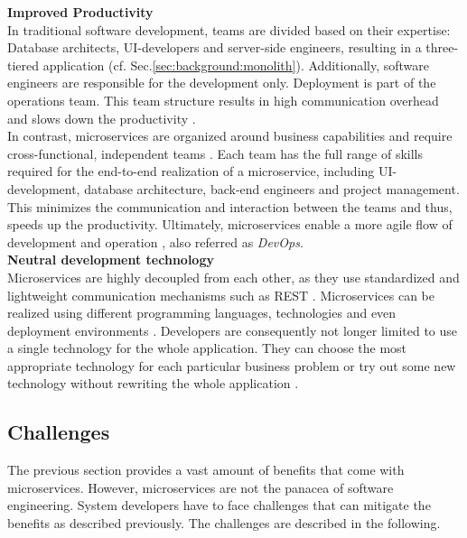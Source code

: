 \noindent
\textbf{Improved Productivity} \\
In traditional software development, teams are divided based on their expertise: Database architects, UI-developers and server-side engineers, resulting in a three-tiered application (cf. Sec.\ref{sec:background:monolith}). Additionally, software engineers are responsible for the development only. Deployment is part of the operations team. This team structure results in high communication overhead and slows down the productivity \cite{Mazlami}. \\
In contrast, microservices are organized around business capabilities and require cross-functional, independent teams \cite{ObjectAwareAmiri}. Each team has the full range of skills required for the end-to-end realization of a microservice, including UI-development, database architecture, back-end engineers and project management. 
This minimizes the communication and interaction between the teams and thus, speeds up the productivity. Ultimately, microservices enable a more agile flow of development and operation \cite{ClassificationOfRefactoring}, also referred as \textit{DevOps}. 
\\


\noindent
\textbf{Neutral development technology} \\
Microservices are highly decoupled from each other, as they use standardized and lightweight communication mechanisms such as REST \cite{FunctionalDecompositionHeinrich}. Microservices can be realized using different programming languages, technologies and even deployment environments \cite{DataflowDrivenChen}. Developers are consequently not longer limited to use a single technology for the whole application. They can choose the most appropriate technology for each particular business problem or try out some new technology without rewriting the whole application \cite{ServiceCutter} \cite{TowardsTechnique}. 
 



\subsection{Challenges}
The previous section provides a vast amount of benefits that come with microservices. However, microservices are not the panacea of software engineering. System developers have to face challenges that can mitigate the benefits as described previously. The challenges are described in the following. \\ 

